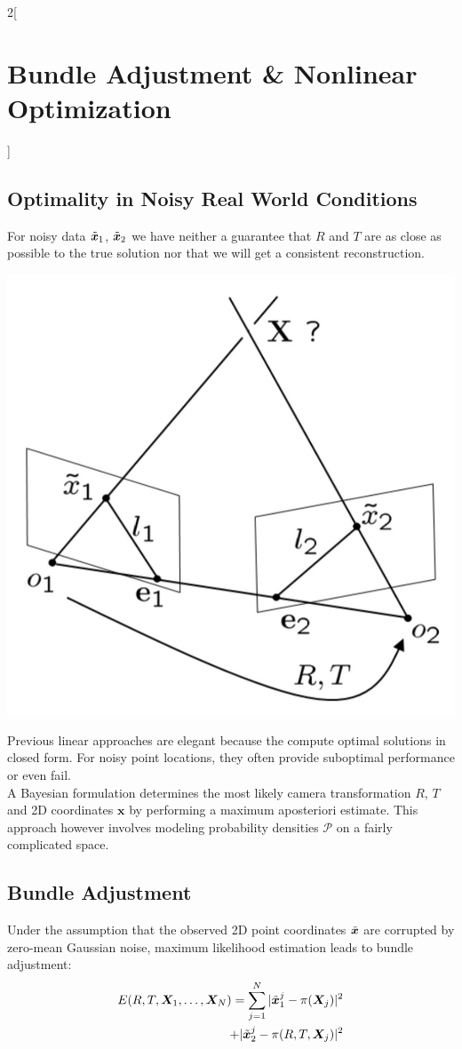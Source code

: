 \documentclass[oneside,fontsize=11pt,paper=a4]{scrartcl}
\newenvironment{myfigure}
  {\par\medskip\noindent\minipage{\linewidth}}
  {\endminipage\par\medskip}
\begin{document}
\begin{multicols}{2}[\section{Bundle Adjustment \& Nonlinear Optimization}]
\subsection{Optimality in Noisy Real World Conditions}
For noisy data $\Tilde{\boldsymbol{x}}_1$, $\Tilde{\boldsymbol{x}}_2$ we have neither a guarantee that $R$ and $T$ are as close as possible to the true solution nor that we will get a consistent reconstruction.

\begin{myfigure}
 \centering
 \includegraphics[width=0.7\linewidth]{Images/Camera_motion_noisy.jpg}
\end{myfigure}

Previous linear approaches are elegant because the compute optimal solutions in closed form.
For noisy point locations, they often provide suboptimal performance or even fail.\\
A Bayesian formulation determines the most likely camera transformation $R$, $T$ and 2D coordinates $\boldsymbol{x}$ by performing a maximum aposteriori estimate.
This approach however involves modeling probability densities $\mathcal{P}$ on a fairly complicated space.

\subsection{Bundle Adjustment}
Under the assumption that the observed 2D point coordinates $\Tilde{\boldsymbol{x}}$ are corrupted by zero-mean Gaussian noise, maximum likelihood estimation leads to bundle adjustment:
\begin{equation*}
\begin{split}
    E(R, T, \boldsymbol{X}_1, \ldots, \boldsymbol{X}_N) = \sum_{j = 1}^N | \Tilde{\boldsymbol{x}}_1^j - \pi (\boldsymbol{X}_j)|^2 \\ + | \Tilde{\boldsymbol{x}}_2^j - \pi (R, T, \boldsymbol{X}_j)|^2
\end{split}
\end{equation*}


\end{multicols}
\end{document}
